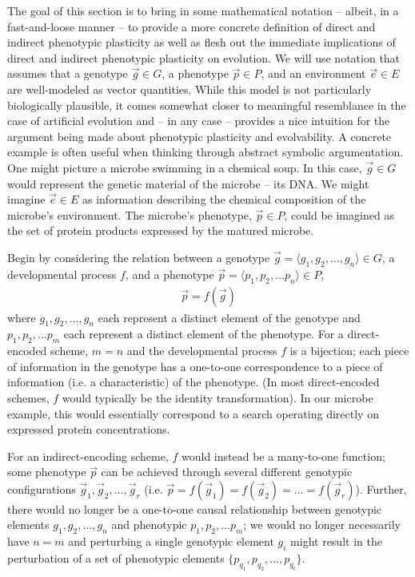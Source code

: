 The goal of this section is to bring in some mathematical notation -- albeit, in a fast-and-loose manner -- to provide a more concrete definition of direct and indirect phenotypic plasticity as well as flesh out the immediate implications of direct and indirect phenotypic plasticity on evolution. We will use notation that assumes that a genotype $\vec{g} \in G$, a phenotype $\vec{p} \in P$, and an environment $\vec{e} \in E$ are well-modeled as vector quantities. While this model is not particularly biologically plausible, it comes somewhat closer to meaningful resemblance in the case of artificial evolution and -- in any case -- provides a nice intuition for the argument being made about phenotypic plasticity and evolvability. A concrete example is often useful when thinking through abstract symbolic argumentation. One might picture a microbe swimming in a chemical soup. In this case, $\vec{g} \in G$ would represent the genetic material of the microbe -- its DNA. We might imagine $\vec{e} \in E$ as information describing the chemical composition of the microbe's environment. The microbe's phenotype, $\vec{p} \in P$, could be imagined as the set of protein products expressed by the matured microbe.

Begin by considering the relation between a genotype $\vec{g} = \langle g_1, g_2, \ldots, g_n \rangle \in G$, a developmental process $f$, and a phenotype $\vec{p} = \langle p_1, p_2, \ldots p_n \rangle \in P$,
\begin{align*}
\vec{p} = f(\vec{g})
\end{align*}
where $g_1, g_2, \ldots, g_n$ each represent a distinct element of the genotype and $p_1, p_2, \ldots p_m$ each represent a distinct element of the phenotype. For a direct-encoded scheme, $m = n$ and the developmental process $f$ is a bijection; each piece of information in the genotype has a one-to-one correspondence to a piece of information (i.e. a characteristic) of the phenotype. (In most direct-encoded schemes, $f$ would typically be the identity transformation). In our microbe example, this would essentially correspond to a search operating directly on expressed protein concentrations.

For an indirect-encoding scheme, $f$ would instead be a many-to-one function; some phenotype $\vec{p}$ can be achieved through several different genotypic configurations $\vec{g}_1, \vec{g}_2, \hdots, \vec{g}_r$ (i.e. $\vec{p} = f(\vec{g}_1) = f(\vec{g}_2) = \hdots = f(\vec{g}_r)$). Further, there would no longer be a one-to-one causal relationship between genotypic elements $g_1, g_2, \ldots, g_n$ and phenotypic $p_1, p_2, \ldots p_m$; we would no longer necessarily have $n = m$ and perturbing a single genotypic element $g_i$ might result in the perturbation of a set of phenotypic elements $\{p_{q_1}, p_{q_2}, \hdots, p_{q_t}\}$.

